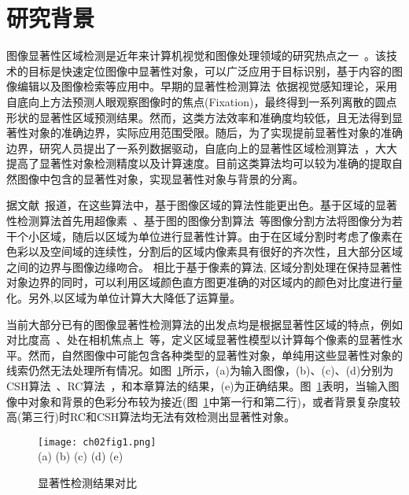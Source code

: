 \section{研究背景}
\label{sec:background}
图像显著性区域检测是近年来计算机视觉和图像处理领域的研究热点之一~\cite{saliencySurvey}。该技术的目标是快速定位图像中显著性对象，可以广泛应用于目标识别，基于内容的图像编辑以及图像检索等应用中。早期的显著性检测算法~\cite{itti}依据视觉感知理论，采用自底向上方法预测人眼观察图像时的焦点(Fixation)，最终得到一系列离散的圆点形状的显著性区域预测结果。然而，这类方法效率和准确度均较低，且无法得到显著性对象的准确边界，实际应用范围受限。随后，为了实现提前显著性对象的准确边界，研究人员提出了一系列数据驱动，自底向上的显著性区域检测算法~\cite{Achanta08,ChengPAMI,ufo,Yan2014Hierarchical}，大大提高了显著性对象检测精度以及计算速度。目前这类算法均可以较为准确的提取自然图像中包含的显著性对象，实现显著性对象与背景的分离。\par
据文献~报道，在这些算法中，基于图像区域的算法性能更出色。基于区域的显著性检测算法首先用超像素~\cite{SLIC}、基于图的图像分割算法~\cite{graphseg}等图像分割方法将图像分为若干个小区域，随后以区域为单位进行显著性计算。由于在区域分割时考虑了像素在色彩以及空间域的连续性，分割后的区域内像素具有很好的齐次性，且大部分区域之间的边界与图像边缘吻合。 相比于基于像素的算法, 区域分割处理在保持显著性对象边界的同时，可以利用区域颜色直方图更准确的对区域内的颜色对比度进行量化。另外,以区域为单位计算大大降低了运算量。\par
当前大部分已有的图像显著性检测算法的出发点均是根据显著性区域的特点，例如对比度高~\cite{ChengPAMI}、处在相机焦点上~\cite{ufo}等，定义区域显著性模型以计算每个像素的显著性水平。然而，自然图像中可能包含各种类型的显著性对象，单纯用这些显著性对象的线索仍然无法处理所有情况。如图~\ref{fig:saliencyCom}所示，(a)为输入图像，(b)、(c)、(d)分别为CSH算法~\cite{Yan2014Hierarchical}、RC算法~\cite{ChengPAMI}，和本章算法的结果，(e)为正确结果。图~\ref{fig:saliencyCom}表明，当输入图像中对象和背景的色彩分布较为接近(图~\ref{fig:saliencyCom}中第一行和第二行)，或者背景复杂度较高(第三行)时RC和CSH算法均无法有效检测出显著性对象。
\begin{figure}[htb]
  \centering%
      {\texttt{[image: ch02fig1.png]}}\\
(a)\quad\quad\quad\quad\quad
(b)\quad\quad\quad\quad\quad\quad
(c)\quad\quad\quad\quad\quad\quad
(d)\quad\quad\quad\quad\quad
(e)
  \caption{显著性检测结果对比}
  \label{fig:saliencyCom}
\end{figure}


